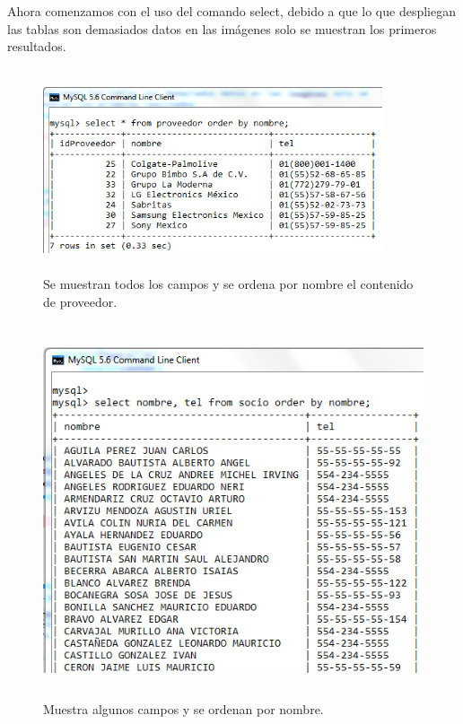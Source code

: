 \documentclass[12pt, titlepage]{article}
\begin{document}
    Ahora comenzamos con el uso del comando select, debido a que lo que despliegan las tablas son demasiados datos en las imágenes solo se muestran los primeros resultados.
    \begin{figure}[H]
        \begin{center}
            \includegraphics[width=10cm, height=6cm]{img/campos.png}
            \caption{Se muestran todos los campos y se ordena por nombre el contenido de proveedor.}
            \label{fig:arlter}
        \end{center}
    \end{figure}
\begin{figure}[H]
    \begin{center}
        \includegraphics[width=12cm, height=11cm]{img/order.png}
        \caption{Muestra algunos campos y se ordenan por nombre.}
        \label{fig:arlter2}
    \end{center}
\end{figure}
\end{document}
